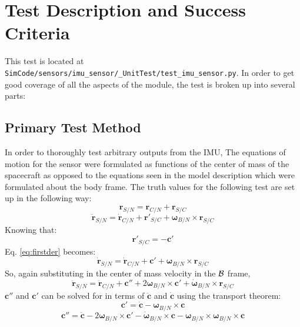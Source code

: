 \section{Test Description and Success Criteria}
This test is located at {\tt SimCode/sensors/imu\_sensor/\_UnitTest/test\_imu\_sensor.py}. In order to get good coverage of all the aspects of the module, the test is broken up into several parts: \par

\subsection{Primary Test Method}
In order to thoroughly test arbitrary outputs from the IMU, The equations of motion for the sensor were formulated as functions of the center of mass of the spacecraft as opposed to the equations seen in the model description which were formulated about the body frame. The truth values for the following test are set up in the following way:
\begin{equation}
{\bm{r}}_{S/N} = {\bm{r}}_{C/N} + {\bm{r}}_{S/C}
\end{equation}
\begin{equation}
\dot{{\bm{r}}}_{S/N} = \dot{{\bm{r}}}_{C/N} + {\bm{r}}'_{S/C} + \bm{\omega}_{B/N} \times {\bm{r}}_{S/C}
\label{eq:firstder}
\end{equation}
Knowing that:
\begin{equation}
{\bm{r}}'_{S/C} = - \bm{c}'
\end{equation}
Eq. \ref{eq:firstder} becomes:
\begin{equation}
	\dot{{\bm{r}}}_{S/N} = \dot{{\bm{r}}}_{C/N} + \bm{c}' + \bm{\omega}_{B/N} \times {\bm{r}}_{S/C}
\end{equation}
So, again substituting in the center of mass velocity in the $\cal{B}$ frame,
\begin{equation}
\ddot{{\bm{r}}}_{S/N} = \ddot{{\bm{r}}}_{C/N} + \bm{c}'' + 2\bm{\omega}_{B/N} \times \bm{c}'  + \dot{\bm{\omega}}_{B/N} \times {\bm{r}}_{S/C}
\label{eq:SN}
\end{equation}
$ \bm{c}''$ and $ \bm{c}'$ can be solved for in terms of $\ddot{\bm{c}}$ and $\dot{\bm{c}}$ using the transport theorem:
\begin{equation}
\bm{c}'   = \dot{\bm{c}} - \bm{\omega}_{B/N} \times \bm{c}
\end{equation}
\begin{equation}
\bm{c}''  = \ddot{\bm{c}}  - 2\bm{\omega}_{B/N} \times \bm{c}' - \dot{\bm{\omega}}_{B/N} \times \bm{c}  -\bm{\omega}_{B/N} \times \bm{\omega}_{B/N} \times \bm{c}
\end{equation}
